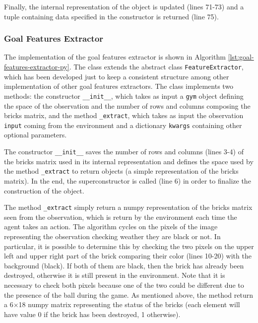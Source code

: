 Finally, the internal representation of the object is updated (lines 71-73)
and a tuple containing data specified in the constructor is returned (line 75).


\subsubsection{Goal Features Extractor}
The implementation of the goal features extractor is shown in Algorithm
\ref{lst:goal-features-extractor-py}. The class extends the abstract class
\texttt{FeatureExtractor}, which has been developed just to
keep a consistent structure among other implementation of other goal features
extractors. The class implements two methods: the constructor
\texttt{__init__}, which takes as input a \texttt{gym} object defining the space
of the observation and the number of rows and columns composing the bricks
matrix, and the method \texttt{_extract}, which takes as input
the observation \texttt{input} coming from the environment and a dictionary
\texttt{kwargs} containing other optional parameters.

The constructor \texttt{__init__} saves the number of rows and columns
(lines 3-4) of the
bricks matrix used in its internal representation and defines the space used
by the method \texttt{_extract} to return objects (a simple representation
of the bricks matrix). In the end, the superconstructor is called (line 6)
in order to finalize the construction of the object.

The method \texttt{\_extract} simply return a numpy representation of the
bricks matrix seen from the observation, which is return by the environment
each time the agent takes an action. The algorithm cycles on the pixels
of the image representing the observation checking weather they are black
or not. In particular, it is possible to determine this by checking the two
pixels on the upper left and upper right part of the brick comparing their
color (lines 10-20) with the background (black). If both of them are black, then the brick
has already been destroyed, otherwise it is still present in the environment.
Note that it is necessary to check both pixels because one of the two could
be different due to the presence of the ball during the game. As mentioned
above, the method return a 6$\times$18 numpy matrix representing the status of
the bricks (each element will have value 0 if the brick has been destroyed,
1 otherwise).


